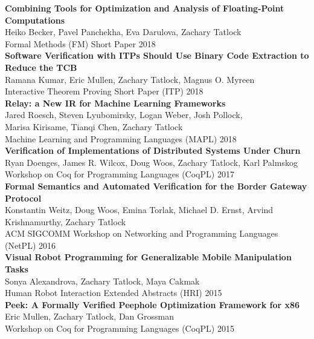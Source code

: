 \documentclass[10pt]{article}
\begin{document}
\textbf{%
Combining Tools for Optimization and Analysis of Floating-Point Computations
} \\
Heiko Becker, Pavel Panchekha, Eva Darulova, Zachary Tatlock \\
Formal Methods (FM) Short Paper 2018 \\

\textbf{%
Software Verification with ITPs Should Use Binary Code Extraction to Reduce the TCB
} \\
Ramana Kumar, Eric Mullen, Zachary Tatlock, Magnus O. Myreen \\
Interactive Theorem Proving Short Paper (ITP) 2018 \\

\textbf{%
Relay: a New IR for Machine Learning Frameworks
} \\
Jared Roesch, Steven Lyubomirsky, Logan Weber, Josh Pollock, \\
Marisa Kirisame, Tianqi Chen, Zachary Tatlock \\
Machine Learning and Programming Languages (MAPL) 2018 \\

\textbf{%
Verification of Implementations of Distributed Systems Under Churn
} \\
Ryan Doenges, James R. Wilcox, Doug Woos, Zachary Tatlock, Karl Palmskog \\
Workshop on Coq for Programming Languages (CoqPL) 2017 \\

\textbf{%
Formal Semantics and Automated Verification for the Border Gateway Protocol
} \\
Konstantin Weitz, Doug Woos, Emina Torlak, Michael D. Ernst, Arvind Krishnamurthy, Zachary Tatlock \\
ACM SIGCOMM Workshop on Networking and Programming Languages (NetPL) 2016 \\

\textbf{%
Visual Robot Programming for Generalizable Mobile Manipulation Tasks
} \\
Sonya Alexandrova, Zachary Tatlock, Maya Cakmak \\
Human Robot Interaction Extended Abstracts (HRI) 2015 \\

\textbf{%
Peek: A Formally Verified Peephole Optimization Framework for x86
} \\
Eric Mullen, Zachary Tatlock, Dan Grossman \\
Workshop on Coq for Programming Languages (CoqPL) 2015 \\
\end{document}
